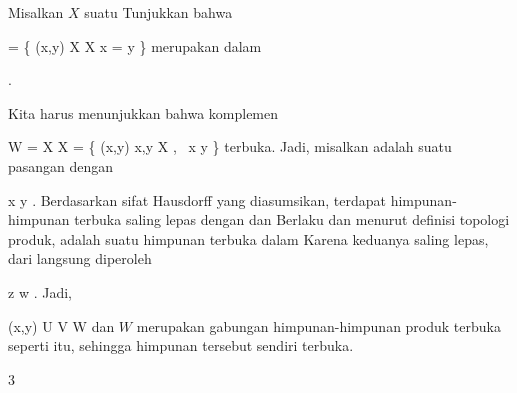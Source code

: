 {

Misalkan $X$ suatu
Tunjukkan bahwa

\mavergleichskettedisp
{\vergleichskette
{ \triangle
}
{ =} { \left\{ (x,y) \in X \times X  \mid   x = y        \right\}
}
{ } {
}
{ } {
}
{ } {
}
}
{}{}{}
merupakan
dalam

.

}
{

Kita harus menunjukkan bahwa komplemen

\mavergleichskettedisp
{\vergleichskette
{W
}
{ =} { X \times X \setminus \triangle
}
{ =} { \left\{  (x,y)   \mid   x,y \in X , \,  x \neq y       \right\}
}
{ } {
}
{ } {
}
}
{}{}{}
terbuka. Jadi, misalkan
 adalah suatu pasangan dengan

\mavergleichskette
{\vergleichskette
{ x
}
{ \neq }{ y
}
{  }{
}
{    }{
}
{   }{
}
}
{}{}{.}
Berdasarkan sifat Hausdorff yang diasumsikan, terdapat himpunan-himpunan terbuka saling lepas
 dengan
 dan
 Berlaku
 dan menurut definisi topologi produk,
 adalah suatu himpunan terbuka dalam
 Karena keduanya saling lepas, dari
 langsung diperoleh

\mavergleichskette
{\vergleichskette
{z
}
{ \neq }{w
}
{  }{
}
{    }{
}
{   }{
}
}
{}{}{.}
Jadi,

\mavergleichskettedisp
{\vergleichskette
{(x,y)
}
{ \in} { U \times V
}
{ \subseteq} {  W
}
{ } {
}
{ } {
}
}
{}{}{}
dan $W$ merupakan gabungan himpunan-himpunan produk terbuka seperti itu, sehingga himpunan tersebut sendiri terbuka.

 }



{3}

